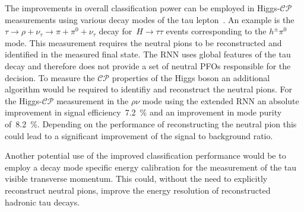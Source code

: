 The improvements in overall classification power can be employed in
Higgs-$\mathcal{CP}$ measurements using various decay modes of the tau
lepton~\cite{Berge2014}. An example is
the~$\tau \to \rho + \nu_\tau \to \pi + \pi^0 + \nu_\tau$ decay
for~$H \to \tau\tau$ events corresponding to the $h^\pm \pi^0$ mode. This
measurement requires the neutral pions to be reconstructed and identified in the
measured final state. The RNN uses global features of the tau decay and
therefore does not provide a set of neutral PFOs responsible for the decision.
To measure the $\mathcal{CP}$ properties of the Higgs boson an additional
algorithm would be required to identifiy and reconstruct the neutral pions. For
the Higgs-$\mathcal{CP}$ measurement in the $\rho\nu$ mode using the extended
RNN an absolute improvement in signal efficiency~\SI{7.2}{\percent} and an
improvement in mode purity of~\SI{8.2}{\percent}. Depending on the performance
of reconstructing the neutral pion this could lead to a significant improvement
of the signal to background ratio.

Another potential use of the improved classification performance would be to
employ a decay mode specific energy calibration for the measurement of the tau
visible transverse momentum. This could, without the need to explicitly
reconstruct neutral pions, improve the energy resolution of reconstructed
hadronic tau decays.


